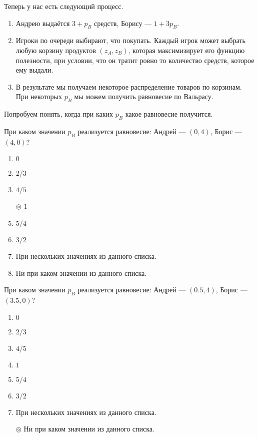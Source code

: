 Теперь у нас есть следующий процесс.

\begin{enumerate}
	\item Андрею выдаётся $3+p_B$ средств, Борису --- $1+3p_B$.
	\item Игроки по очереди выбирают, что покупать. Каждый игрок может выбрать любую корзину продуктов $(z_A,z_B)$, которая максимизирует его функцию полезности, при условии, что он тратит ровно то количество средств, которое ему выдали.
	\item В результате мы получаем некоторое распределение товаров по корзинам. При некоторых $p_B$ мы можем получить равновесие по Вальрасу.
\end{enumerate}
Попробуем понять, когда при каких $p_B$ какое равновесие получится.

При каком значении $p_B$ реализуется равновесие: Андрей --- $(0,4)$, Борис --- $(4,0)$?

\begin{enumerate}[label=$\circ$]	%
	\item $0$
	\item $2/3$
	\item $4/5$
	\item[$\circledcirc$] $1$
	\item $5/4$
	\item $3/2$
	\item При нескольких значениях из данного списка.
	\item Ни при каком значении из данного списка.
\end{enumerate}

\task
При каком значении $p_B$ реализуется равновесие: Андрей --- $(0.5,4)$, Борис --- $(3.5,0)$?

\begin{enumerate}[label=$\circ$] %
	\item $0$
	\item $2/3$
	\item $4/5$
	\item $1$
	\item $5/4$
	\item $3/2$
	\item При нескольких значениях из данного списка.
	\item[$\circledcirc$] Ни при каком значении из данного списка.
\end{enumerate}
